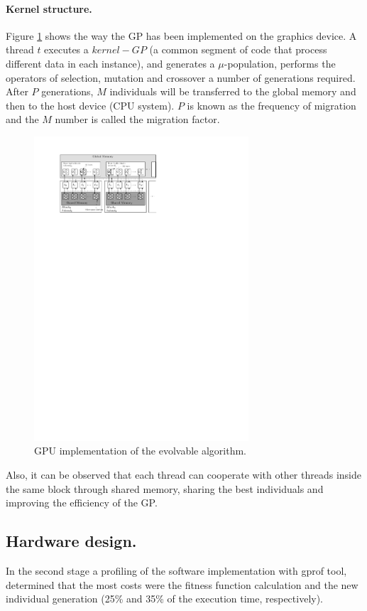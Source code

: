 \documentclass{sig-alternate}
\begin{document}
\paragraph{Kernel structure.}
Figure \ref{fig:migration_scheme} shows the way the GP has been implemented on the graphics device. A thread $t$ executes a $kernel-GP$ (a common segment of code that process different data in each instance), and generates a $\mu$-population, performs the operators of selection, mutation and crossover a number of generations required. After $P$ generations, $M$ individuals will be transferred to the global memory and then to the host device (CPU system). $P$ is known as the frequency of migration and the $M$ number is called the migration factor.

\begin{figure}[htpb]
\begin{center} 
\includegraphics[width=8cm]{./images/migration_scheme} \end{center}
\caption{GPU implementation of the evolvable algorithm.}\label{fig:migration_scheme}
\end{figure}

Also, it can be observed that each thread can cooperate with other threads inside the same block through shared memory, sharing the best individuals and improving the efficiency of the GP.



\subsection{Hardware design.}
In the second stage a profiling of the software implementation with gprof tool, determined that the most costs were the fitness function calculation and the new individual generation (25\% and 35\% of the execution time, respectively).
\end{document}
